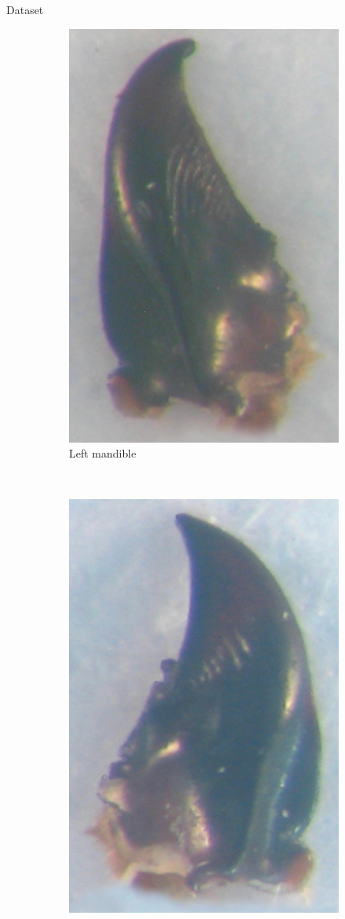 \documentclass[10pt]{beamer}
\begin{document}
\begin{frame}[c]{Dataset}
\begin{figure}[htbp]
\begin{subfigure}[t]{0.22\textwidth}
        			\includegraphics[scale=.13]{images/mgmo}
        			\caption{\footnotesize{Left mandible}}
        			\label{figsub11}
    			\end{subfigure}%
    			~ 
    			\begin{subfigure}[t]{0.22\textwidth}
        			\centering
        			\includegraphics[scale=.13]{images/mdmo}

\end{subfigure}
\end{figure}
\end{frame}
\end{document}

